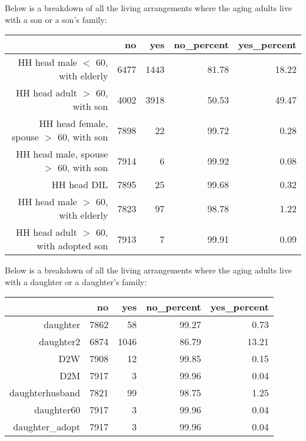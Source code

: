 \documentclass[11pt]{article}
\begin{document}
Below is a breakdown of all the living arrangements where the aging adults live with a son or a son's family:\\
\begin{table}[ht]
\centering
\begin{tabular}{rrrrr}
  \hline
 & no & yes & no\_percent & yes\_percent \\ 
  \hline
HH head male $<$ 60, with elderly & 6477 & 1443 & 81.78 & 18.22 \\ 
  HH head adult $>$ 60, with son & 4002 & 3918 & 50.53 & 49.47 \\ 
  HH head female, spouse $>$ 60, with son & 7898 & 22 & 99.72 & 0.28 \\ 
  HH head male, spouse $>$ 60, with son & 7914 & 6 & 99.92 & 0.08 \\ 
  HH head DIL & 7895 & 25 & 99.68 & 0.32 \\ 
  HH head male $>$ 60, with elderly & 7823 & 97 & 98.78 & 1.22 \\ 
  HH head adult $>$ 60, with adopted son & 7913 & 7 & 99.91 & 0.09 \\ 
   \hline
\end{tabular}
\end{table}\newline
Below is a breakdown of all the living arrangements where the aging adults live with a daughter or a daughter's family:\\
\begin{table}[H]
\centering
\begin{tabular}{rrrrr}
  \hline
 & no & yes & no\_percent & yes\_percent \\ 
  \hline
daughter & 7862 & 58 & 99.27 & 0.73 \\ 
  daughter2 & 6874 & 1046 & 86.79 & 13.21 \\ 
  D2W & 7908 & 12 & 99.85 & 0.15 \\ 
  D2M & 7917 & 3 & 99.96 & 0.04 \\ 
  daughterhusband & 7821 & 99 & 98.75 & 1.25 \\ 
  daughter60 & 7917 & 3 & 99.96 & 0.04 \\ 
  daughter\_adopt & 7917 & 3 & 99.96 & 0.04 \\ 
   \hline
\end{tabular}
\end{table}\newline
\end{document}
